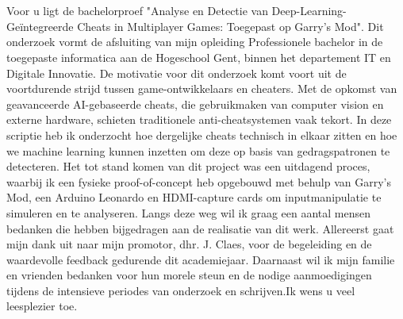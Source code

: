 
\chapter*{}%
\label{ch:voorwoord}


Voor u ligt de bachelorproef "Analyse en Detectie van Deep-Learning-Geïntegreerde Cheats in Multiplayer Games: Toegepast op Garry's Mod". Dit onderzoek vormt de afsluiting van mijn opleiding Professionele bachelor in de toegepaste informatica aan de Hogeschool Gent, binnen het departement IT en Digitale Innovatie.  De motivatie voor dit onderzoek komt voort uit de voortdurende strijd tussen game-ontwikkelaars en cheaters. Met de opkomst van geavanceerde AI-gebaseerde cheats, die gebruikmaken van computer vision en externe hardware, schieten traditionele anti-cheatsystemen vaak tekort. In deze scriptie heb ik onderzocht hoe dergelijke cheats technisch in elkaar zitten en hoe we machine learning kunnen inzetten om deze op basis van gedragspatronen te detecteren.  Het tot stand komen van dit project was een uitdagend proces, waarbij ik een fysieke proof-of-concept heb opgebouwd met behulp van Garry’s Mod, een Arduino Leonardo en HDMI-capture cards om inputmanipulatie te simuleren en te analyseren.  Langs deze weg wil ik graag een aantal mensen bedanken die hebben bijgedragen aan de realisatie van dit werk. Allereerst gaat mijn dank uit naar mijn promotor, dhr. J. Claes, voor de begeleiding en de waardevolle feedback gedurende dit academiejaar.  Daarnaast wil ik mijn familie en vrienden bedanken voor hun morele steun en de nodige aanmoedigingen tijdens de intensieve periodes van onderzoek en schrijven.Ik wens u veel leesplezier toe.